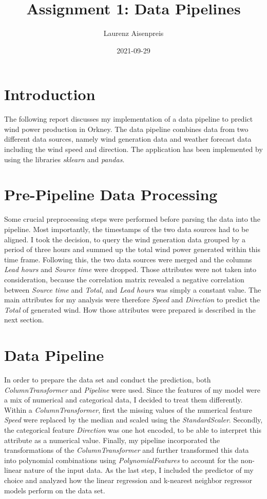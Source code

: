 \documentclass[12pt, a4paper]{article}
\title{Assignment 1: Data Pipelines}
\author{Laurenz Aisenpreis}
\date{2021-09-29}
\begin{document}
\maketitle

\section{Introduction}

The following report discusses my implementation of a data pipeline to predict wind power production in Orkney. The data pipeline combines data from two different data sources, namely wind generation data and weather forecast data including the wind speed and direction.  
The application has been implemented by using the libraries \emph{sklearn} and \emph{pandas}.

\section{Pre-Pipeline Data Processing}

Some crucial preprocessing steps were performed before parsing the data into the pipeline. Most importantly, the timestamps of the two data sources had to be aligned. I took the decision, to query the wind generation data grouped by a period of three hours and summed up the total wind power generated within this time frame.
Following this, the two data sources were merged and the columns \emph{Lead hours} and \emph{Source time} were dropped. Those attributes were not taken into consideration, because the correlation matrix revealed a negative correlation between \emph{Source time} and \emph{Total}, and \emph{Lead hours} was simply a constant value. The main attributes for my analysis were therefore \emph{Speed} and \emph{Direction} to predict the \emph{Total} of generated wind. How those attributes were prepared is described in the next section.

\section{Data Pipeline}

In order to prepare the data set and conduct the prediction, both \emph{ColumnTransformer} and \emph{Pipeline} were used. Since the features of my model were a mix of numerical and categorical data, I decided to treat them differently. Within a \emph{ColumnTransformer}, first the missing values of the numerical feature \emph{Speed} were replaced by the median and scaled using the \emph{StandardScaler}. Secondly, the categorical feature \emph{Direction} was one hot encoded, to be able to interpret this attribute as a numerical value. \newline
Finally, my pipeline incorporated the transformations of the \emph{ColumnTransformer} and further transformed this data into polynomial combinations using \emph{PolynomialFeatures} to account for the non-linear nature of the input data. As the last step, I included the predictor of my choice and analyzed how the linear regression and k-nearest neighbor regressor models perform on the data set.
\end{document}
